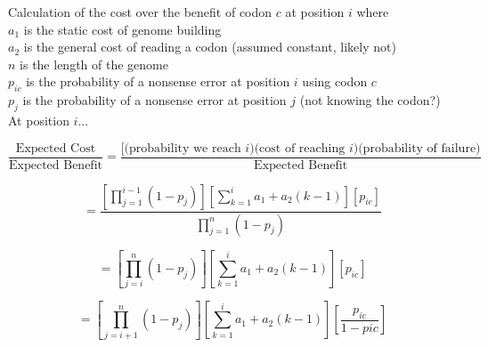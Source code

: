 \documentclass[11pt]{article} %
\begin{document}


Calculation of the cost over the benefit of codon $c$ at position $i$ where\\
$a_1$ is the static cost of genome building\\
$a_2$ is the general cost of reading a codon (assumed constant, likely not)\\
$n$ is the length of the genome\\
$p_{ic}$ is the probability of a nonsense error at position $i$ using codon $c$\\
$p_j$ is the probability of a nonsense error at position $j$ (not knowing the codon?)\\


At position $i$...

$$\frac{\mbox{Expected Cost}}{\mbox{Expected Benefit}} =
\frac{[\mbox{(probability we reach $i$)(cost of reaching $i$)(probability of failure)}}
{\mbox{Expected Benefit}}$$

$$=
\frac{
\left[\prod_{j=1}^{i-1}(1 - p_{j})\right]
\left[\sum_{k=1}^{i} a_1 + a_2(k-1)\right]
\left[p_{ic}\right]
}{
\prod_{j=1}^{n}(1 - p_{j})
}$$


$$=
\left[\prod_{j=i}^{n}(1 - p_{j})\right]
\left[\sum_{k=1}^{i} a_1 + a_2(k-1)\right]
\left[p_{ic}\right]
$$


$$=
\left[\prod_{j=i+1}^{n}(1 - p_{j})\right]
\left[\sum_{k=1}^{i} a_1 + a_2(k-1)\right]
\left[\frac{p_{ic}}{1-p{ic}}\right]
$$


\end{document}
